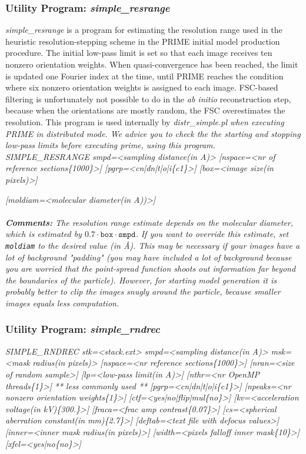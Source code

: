 \documentclass[review]{elsarticle}
\begin{document}
{\subsubsection{Utility Program: {\it{simple\_resrange}}}
\label{resrange}
{\it{simple\_resrange}} is a program for estimating the resolution range used in the heuristic resolution-stepping scheme in the PRIME initial model production procedure. The initial low-pass limit is set so that each image receives ten nonzero orientation weights. When quasi-convergence has been reached, the limit is updated one Fourier index at the time, until PRIME reaches the condition where six nonzero orientation weights is assigned to each image. FSC-based filtering is unfortunately not possible to do in the \textit{ab initio} reconstruction step, because when the orientations are mostly random, the FSC overestimates the resolution. This program is used internally by {\it{distr\_simple.pl} when executing PRIME in distributed mode. We advice you to check the the starting and stopping low-pass limits before executing prime, using this program.}\\
{\it{SIMPLE\_RESRANGE smpd=<sampling distance(in A)> [nspace=<nr of reference}}
{\it{sections\{1000\}>] [pgrp=<cn|dn|t|o|i\{c1\}>] [box=<image size(in pixels)>]}}
{\it{[moldiam=<molecular diameter(in A))>]}
\\\\
\noindent\textbf{Comments:} The resolution range estimate depends on the molecular diameter, which is estimated by $0.7\cdot{}\texttt{box}\cdot{}\texttt{smpd}$. If you want to override this estimate, set \texttt{moldiam} to the desired value (in \AA{}). This may be necessary if your images have a lot of background "padding" (you may have included a lot of background because you are worried that the point-spread function shoots out information far beyond the boundaries of the particle). However, for starting model generation it is probably better to clip the images snugly around the particle, because smaller images equals less computation.

\subsubsection{Utility Program: {\it{simple\_rndrec}}}
\label{rndrec}
{\it{SIMPLE\_RNDREC stk=<stack.ext> smpd=<sampling distance(in A)> msk=<mask}}
{\it{radius(in pixels)> [nspace=<nr reference sections\{1000\}>] [nran=<size of}}
{\it{random sample>] [lp=<low-pass limit(in A)>] [nthr=<nr OpenMP threads\{1\}>]}}
{\it{** less commonly used **}}
{\it{[pgrp=<cn|dn|t|o|i\{c1\}>] [npeaks=<nr nonzero orientation weights\{1\}>]}}
{\it{[ctf=<yes|no|flip|mul\{no\}>] [kv=<acceleration voltage(in kV)\{300.\}>]}}
{\it{[fraca=<frac amp contrast\{0.07\}>] [cs=<spherical aberration constant(in}}
{\it{mm)\{2.7\}>] [deftab=<text file with defocus values>] [inner=<inner mask}}
{\it{radius(in pixels)>] [width=<pixels falloff inner mask\{10\}>]}}
{\it{[xfel=<yes|no\{no\}>]}}

}}
\end{document}
